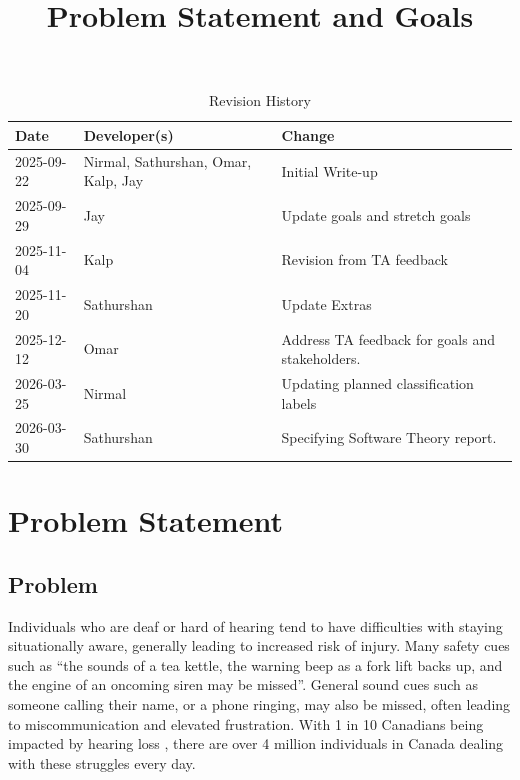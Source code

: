\documentclass{article}
\title{Problem Statement and Goals\\\progname}
\author{\authname}
\date{}
\begin{document}
\maketitle

\begin{table}[hp]
\caption{Revision History} \label{TblRevisionHistory}
\begin{tabularx}{\textwidth}{llX}
\toprule
\textbf{Date} & \textbf{Developer(s)} & \textbf{Change}\\
\midrule
2025-09-22 & Nirmal, Sathurshan, Omar, Kalp, Jay & Initial Write-up\\
2025-09-29 & Jay & Update goals and stretch goals\\
2025-11-04 & Kalp & Revision from TA feedback\\
2025-11-20 & Sathurshan & Update Extras\\
2025-12-12 & Omar & Address TA feedback for goals and stakeholders.\\
2026-03-25 & Nirmal & Updating planned classification labels\\
2026-03-30 & Sathurshan & Specifying Software Theory report.\\
\bottomrule
\end{tabularx}
\end{table}

\setlength{\parindent}{0pt}

\newpage{}

\section{Problem Statement}

\subsection{Problem}

Individuals who are deaf or hard of hearing tend to have difficulties with
staying situationally aware, generally leading to increased risk of injury. Many
safety cues such as ``the sounds of a tea kettle, the warning beep as a fork lift
backs up, and the engine of an oncoming siren may be missed''. \cite{Masterson2016}
General sound cues such as someone calling their name, or a phone ringing, may
also be missed, often leading to miscommunication and elevated frustration. With
1 in 10 Canadians being impacted by hearing loss \cite{Healthing2025}, there are
over 4 million individuals in Canada dealing with these struggles every day.
\end{document}
